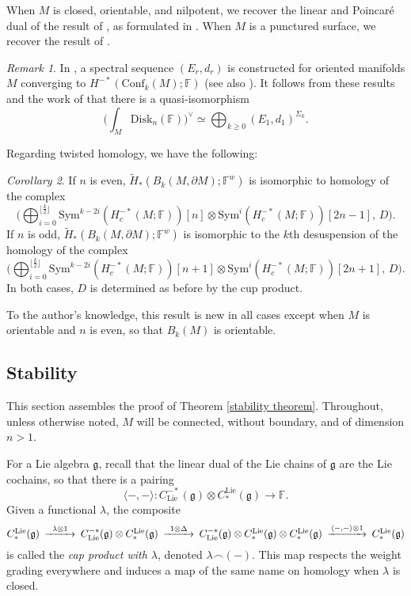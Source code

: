 \documentclass{compositio}
\theoremstyle{definition}\newtheorem{definition}{Definition}[section]
\theoremstyle{theorem}\newtheorem{lemma}[definition]{Lemma}
\theoremstyle{remark}\newtheorem*{conventions}{Conventions}
\theoremstyle{remark}\newtheorem*{acknowledgments}{Acknowledgments}
\theoremstyle{remark}\newtheorem*{outline}{Outline}
\theoremstyle{remark}\newtheorem*{questions}{Questions}
\theoremstyle{remark}\newtheorem{example}[definition]{Example}
\theoremstyle{definition}\newtheorem{construction}[definition]{Construction}
\theoremstyle{definition}\newtheorem*{convention}{Convention}
\theoremstyle{definition}\newtheorem*{conjecture}{Conjecture}
\theoremstyle{theorem}\newtheorem{theorem}[definition]{Theorem}
\theoremstyle{theorem}\newtheorem{paradigm}[definition]{Paradigm}
\theoremstyle{remark}\newtheorem{remark}[definition]{Remark}
\theoremstyle{corollary}\newtheorem{corollary}[definition]{Corollary}
\theoremstyle{theorem}\newtheorem{proposition}[definition]{Proposition}
\theoremstyle{definition}\newtheorem{question}[definition]{Question}
\begin{document}
When $M$ is closed, orientable, and nilpotent, we recover the linear and Poincar\'{e} dual of the result of \cite{FT}, as formulated in \cite{FelixTanre}. When $M$ is a punctured surface, we recover the result of \cite{BC}.

\begin{remark}
In \cite{CohenTaylor}, a spectral sequence $(E_r,d_r)$ is constructed for oriented manifolds $M$ converging to $H^{-*}({\mathrm{Conf}}_k(M);\mathbb{F})$ (see also \cite{Totaro}). It follows from these results and the work of \cite{FelixTanre} that there is a quasi-isomorphism $$\bigg(\int_M {\mathrm{Disk}}_n(\mathbb{F})\bigg)^\vee\simeq \bigoplus_{k\geq0}(E_1,d_1)^{\Sigma_k}.$$
\end{remark}

Regarding twisted homology, we have the following:

\begin{corollary}
If $n$ is even, $\widetilde{H}_*(B_k(M,\partial M);\mathbb{F}^w)$ is isomorphic to homology of the complex $$\bigg(\bigoplus_{i=0}^{\lfloor\frac{k}{2}\rfloor}{\mathrm{Sym}}^{k-2i}(H^{-*}_c(M;\mathbb{F}))[n]\otimes{\mathrm{Sym}}^{i}(H^{-*}_c(M;\mathbb{F}))[2n-1],\,D\bigg).$$ If $n$ is odd, $\widetilde{H}_*(B_k(M,\partial M);\mathbb{F}^w)$ is isomorphic to the $k$th desuspension of the homology of the complex $$\bigg(\bigoplus_{i=0}^{\lfloor\frac{k}{2}\rfloor}{\mathrm{Sym}}^{k-2i}(H^{-*}_c(M;\mathbb{F}))[n+1]\otimes{\mathrm{Sym}}^{i}(H^{-*}_c(M;\mathbb{F}))[2n+1],\,D\bigg).$$ In both cases, $D$ is determined as before by the cup product.
\end{corollary}

To the author's knowledge, this result is new in all cases except when $M$ is orientable and $n$ is even, so that $B_k(M)$ is orientable.

\subsection{Stability}\label{stability} This section assembles the proof of Theorem \ref{stability theorem}. Throughout, unless otherwise noted, $M$ will be connected, without boundary, and of dimension $n>1$.

For a Lie algebra $\mathfrak{g}$, recall that the linear dual of the Lie chains of $\mathfrak{g}$ are the Lie cochains, so that there is a pairing $$\langle-,-\rangle:C^{-*}_{\mathrm{Lie}}(\mathfrak{g})\otimes C_*^{\mathrm{Lie}}(\mathfrak{g})\to \mathbb{F}.$$ Given a functional $\lambda$, the composite $$\begin{CD}
C_*^{\mathrm{Lie}}(\mathfrak{g})@>\lambda\otimes1>>C^{-*}_{\mathrm{Lie}}(\mathfrak{g})\otimes C_*^{\mathrm{Lie}}(\mathfrak{g})@>1\otimes\Delta>> C^{-*}_{\mathrm{Lie}}(\mathfrak{g})\otimes C_*^{\mathrm{Lie}}(\mathfrak{g})\otimes C_*^{\mathrm{Lie}}(\mathfrak{g})@>\langle-,-\rangle\otimes 1>>C_*^{\mathrm{Lie}}(\mathfrak{g})
\end{CD}$$ is called the \emph{cap product with $\lambda$}, denoted $\lambda\frown(-)$. This map respects the weight grading everywhere and induces a map of the same name on homology when $\lambda$ is closed. 
\end{document}
